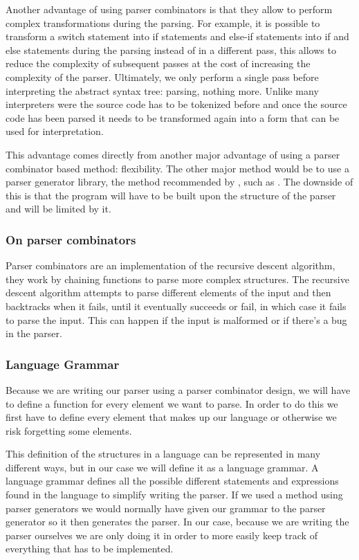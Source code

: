 \documentclass{article}
\begin{document}
Another advantage of using parser combinators is that they allow to perform
complex transformations during the parsing. For example, it is possible to
transform a switch statement into if statements and else-if statements into
if and else statements during the parsing instead of in a different pass, this
allows to reduce the complexity of subsequent passes at the cost of increasing
the complexity of the parser. Ultimately, we only perform a single pass before
interpreting the abstract syntax tree: parsing, nothing more. Unlike many
interpreters were the source code has to be tokenized before and once the
source code has been parsed it needs to be transformed again into a form that
can be used for interpretation.

This advantage comes directly from another major advantage of using a parser
combinator based method: flexibility. The other major method would be to use a
parser generator library, the method recommended by \textcite{eopl}, such as
\textcite{bison}. The downside of this is that the program will have to be
built upon the structure of the parser and will be limited by it.

\subsubsection{On parser combinators}

Parser combinators are an implementation of the recursive descent algorithm,
they work by chaining functions to parse more complex structures. The recursive
descent algorithm attempts to parse different elements of the input and then
backtracks when it fails, until it eventually succeeds or fail, in which case
it fails to parse the input. This can happen if the input is malformed or if
there's a bug in the parser.

\subsubsection{Language Grammar}

Because we are writing our parser using a parser combinator design, we will
have to define a function for every element we want to parse. In order to do
this we first have to define every element that makes up our language or
otherwise we risk forgetting some elements.

This definition of the structures in a language can be represented in many
different ways, but in our case we will define it as a language grammar. A
language grammar defines all the possible different statements and expressions
found in the language to simplify writing the parser. If we used a method using
parser generators we would normally have given our grammar to the parser
generator so it then generates the parser. In our case, because we are writing
the parser ourselves we are only doing it in order to more easily keep track of
everything that has to be implemented.
\end{document}
